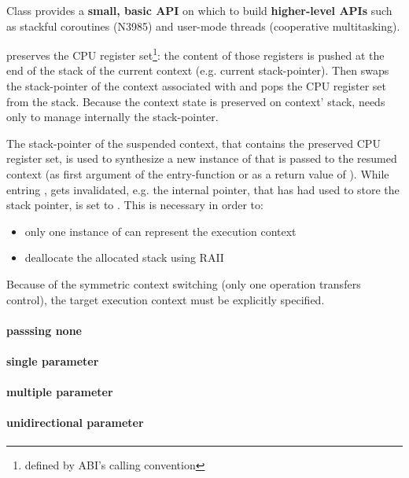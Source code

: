 Class \ectx provides a {\bfseries small, basic API} on which to build {\bfseries
higher-level APIs} such as stackful coroutines (N3985\cite{N3985}) and user-mode
threads (cooperative multitasking).


 preserves the CPU register
set\footnote{defined by ABI's calling convention}: the content of those
registers is pushed at the end of the stack of the current context (e.g. current
stack-pointer). Then \ectxop swaps the stack-pointer of the context associated
with  and pops the CPU register set from the stack.
Because the context state is preserved on context' stack, \ectx needs only to
manage internally the stack-pointer.


The stack-pointer of the suspended context, that contains the preserved CPU
register set, is used to synthesize a new instance of \ectx that is passed to
the resumed context (as first argument of the entry-function or as a return
value of \ectxop).
While entring ,  gets
invalidated, e.g. the internal pointer, that has had used to store the stack
pointer, is set to .
This is necessary in order to:
\begin{itemize}
    \item   only one instance of \ectx can represent the execution context
    \item   deallocate the allocated stack using RAII
\end{itemize}

Because of the symmetric context switching (only one operation transfers
control), the target execution context must be explicitly specified.


\paragraph*{passsing none}
\paragraph*{single parameter}
\paragraph*{multiple parameter}
\paragraph*{unidirectional parameter}
